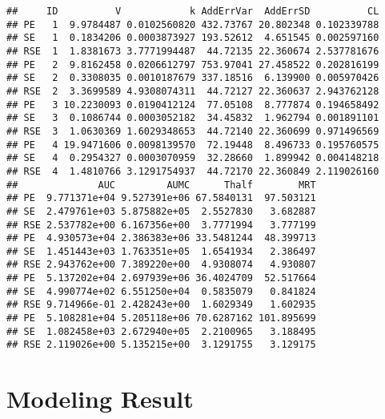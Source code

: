 \documentclass[
  9pt,
]{krantz}
\begin{document}
\begin{verbatim}
##     ID          V            k AddErrVar  AddErrSD          CL
## PE   1  9.9784487 0.0102560820 432.73767 20.802348 0.102339788
## SE   1  0.1834206 0.0003873927 193.52612  4.651545 0.002597160
## RSE  1  1.8381673 3.7771994487  44.72135 22.360674 2.537781676
## PE   2  9.8162458 0.0206612797 753.97041 27.458522 0.202816199
## SE   2  0.3308035 0.0010187679 337.18516  6.139900 0.005970426
## RSE  2  3.3699589 4.9308074311  44.72127 22.360637 2.943762128
## PE   3 10.2230093 0.0190412124  77.05108  8.777874 0.194658492
## SE   3  0.1086744 0.0003052182  34.45832  1.962794 0.001891101
## RSE  3  1.0630369 1.6029348653  44.72140 22.360699 0.971496569
## PE   4 19.9471606 0.0098139570  72.19448  8.496733 0.195760575
## SE   4  0.2954327 0.0003070959  32.28660  1.899942 0.004148218
## RSE  4  1.4810766 3.1291754937  44.72170 22.360849 2.119026160
##              AUC         AUMC      Thalf        MRT
## PE  9.771371e+04 9.527391e+06 67.5840131  97.503121
## SE  2.479761e+03 5.875882e+05  2.5527830   3.682887
## RSE 2.537782e+00 6.167356e+00  3.7771994   3.777199
## PE  4.930573e+04 2.386383e+06 33.5481244  48.399713
## SE  1.451443e+03 1.763351e+05  1.6541934   2.386497
## RSE 2.943762e+00 7.389220e+00  4.9308074   4.930807
## PE  5.137202e+04 2.697939e+06 36.4024709  52.517664
## SE  4.990774e+02 6.551250e+04  0.5835079   0.841824
## RSE 9.714966e-01 2.428243e+00  1.6029349   1.602935
## PE  5.108281e+04 5.205118e+06 70.6287162 101.895699
## SE  1.082458e+03 2.672940e+05  2.2100965   3.188495
## RSE 2.119026e+00 5.135215e+00  3.1291755   3.129175
\end{verbatim}

\hypertarget{modeling-result-1}{%
\section{Modeling Result}\label{modeling-result-1}}
\end{document}
